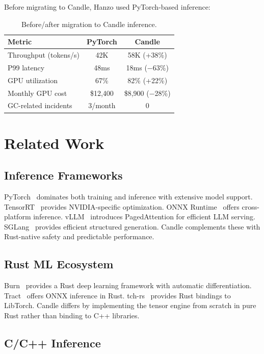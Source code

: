 \documentclass[11pt,twocolumn]{article}
\begin{document}
Before migrating to Candle, Hanzo used PyTorch-based inference:

\begin{table}[H]
\centering
\small
\begin{tabular}{lcc}
\toprule
\textbf{Metric} & \textbf{PyTorch} & \textbf{Candle} \\
\midrule
Throughput (tokens/s) & 42K & 58K (+38\%) \\
P99 latency & 48ms & 18ms ($-$63\%) \\
GPU utilization & 67\% & 82\% (+22\%) \\
Monthly GPU cost & \$12,400 & \$8,900 ($-$28\%) \\
GC-related incidents & 3/month & 0 \\
\bottomrule
\end{tabular}
\caption{Before/after migration to Candle inference.}
\label{tab:migration}
\end{table}

\section{Related Work}
\label{sec:related}

\subsection{Inference Frameworks}

PyTorch~\cite{paszke2019pytorch} dominates both training and inference with extensive model support. TensorRT~\cite{tensorrt2017} provides NVIDIA-specific optimization. ONNX Runtime~\cite{onnxruntime2019} offers cross-platform inference. vLLM~\cite{kwon2023vllm} introduces PagedAttention for efficient LLM serving. SGLang~\cite{zheng2024sglang} provides efficient structured generation. Candle complements these with Rust-native safety and predictable performance.

\subsection{Rust ML Ecosystem}

Burn~\cite{burn2023} provides a Rust deep learning framework with automatic differentiation. Tract~\cite{tract2023} offers ONNX inference in Rust. tch-rs~\cite{tchrs2023} provides Rust bindings to LibTorch. Candle differs by implementing the tensor engine from scratch in pure Rust rather than binding to C++ libraries.

\subsection{C/C++ Inference}
\end{document}
